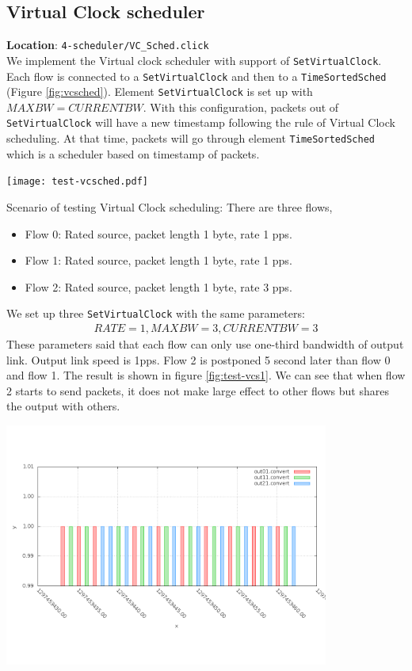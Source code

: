 \documentclass[a4paper]{article}
\begin{document}
  \subsection{Virtual Clock scheduler} \label{section:vcsched}
  \textbf{Location}: \texttt{4-scheduler/VC\_Sched.click}\\
  We implement the Virtual clock scheduler with support of \texttt{SetVirtualClock}. Each flow is connected to a \texttt{SetVirtualClock} and then to a \texttt{TimeSortedSched} (Figure \ref{fig:vcsched}). Element \texttt{SetVirtualClock} is set up with $MAXBW = CURRENTBW$. With this configuration, packets out of \texttt{SetVirtualClock} will have a new timestamp following the rule of Virtual Clock scheduling. At that time, packets will go through element \texttt{TimeSortedSched} which is a scheduler based on timestamp of packets.

  \begin{center}
	\texttt{[image: test-vcsched.pdf]}
	\label{fig:vcsched}
  \end{center}
  Scenario of testing Virtual Clock scheduling: There are three flows,
  \begin{itemize}
  	\item Flow 0: Rated source, packet length 1 byte, rate 1 pps.
  	\item Flow 1: Rated source, packet length 1 byte, rate 1 pps.
  	\item Flow 2: Rated source, packet length 1 byte, rate 3 pps.
  \end{itemize}
  We set up three \texttt{SetVirtualClock} with the same parameters: 
  \begin{align*}RATE = 1, MAXBW = 3, CURRENTBW = 3\end{align*} 
  These parameters said that each flow can only use one-third bandwidth of output link. Output link speed is 1pps. Flow 2 is postponed 5 second later than flow 0 and flow 1. The result is shown in figure \ref{fig:test-vcs1}. We can see that when flow 2 starts to send packets, it does not make large effect to other flows but shares the output with others.
  
  \begin{center}
	\includegraphics[width=0.80\textwidth]{vcs1-dense.png}
	\label{fig:test-vcs1}
  \end{center}
  
\end{document}
